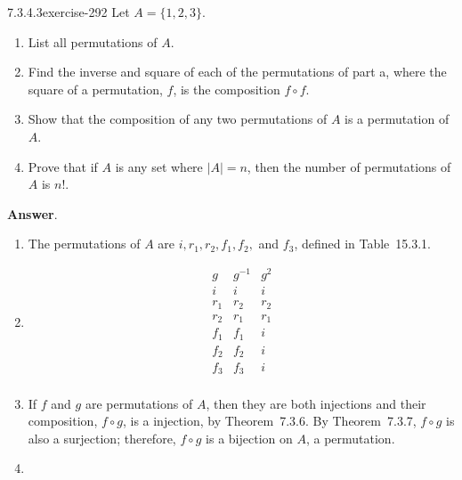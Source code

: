 \documentclass[twoside,10pt,]{book}
\numberwithin{equation}{section}
\begin{document}
\begin{divisionsolution}{7.3.4.3}{}{exercise-292}%
\hypertarget{p-2465}{}%
Let \(A = \{1, 2, 3\}\).%
\par
\hypertarget{p-2466}{}%
\leavevmode%
\begin{enumerate}[label=(\alph*)]
\item\hypertarget{li-1251}{}\hypertarget{p-2467}{}%
List all permutations of \(A\).%
\item\hypertarget{li-1252}{}\hypertarget{p-2468}{}%
Find the inverse and square of each of the permutations of part a, where the square of a permutation, \(f\), is the composition \(f \circ f\).%
\item\hypertarget{li-1253}{}\hypertarget{p-2469}{}%
Show that the composition of any two permutations of \(A\) is a permutation of \(A\).%
\item\hypertarget{li-1254}{}\hypertarget{p-2470}{}%
Prove that if \(A\) is any set where \(\lvert A\rvert= n\), then the number of permutations of \(A\) is \(n!\).%
\end{enumerate}
%
\par\smallskip%
\noindent\textbf{Answer}.\quad%
\hypertarget{p-2471}{}%
\leavevmode%
\begin{enumerate}[label=(\alph*)]
\item\hypertarget{li-1255}{}\hypertarget{p-2472}{}%
The permutations of \(A\) are \(i,r_1,r_2,f_1,f_2,\) and \(f_3\), defined in Table~15.3.1.%
\item\hypertarget{li-1256}{}\hypertarget{p-2473}{}%
%
\begin{equation*}
\begin{array}{ccc}
g  & g^{-1} & g^2 \\
i & i & i \\
r_1 & r_2 & r_2  \\
r_2 & r_1 & r_1  \\
f_1 & f_1 & i \\
f_2 & f_2 & i  \\
f_3 & f_3 & i  \\
\end{array}
\end{equation*}
%
\item\hypertarget{li-1257}{}\hypertarget{p-2474}{}%
If \(f\) and \(g\) are permutations of \(A\), then they are both injections and their composition, \(f\circ g\), is a injection, by Theorem~7.3.6. By Theorem~7.3.7, \(f\circ g\) is also a surjection; therefore, \(f\circ g\) is a bijection on \(A\), a permutation.%
\item\hypertarget{li-1258}{}\hypertarget{p-2475}{}%

\end{enumerate}
\end{divisionsolution}
\end{document}
